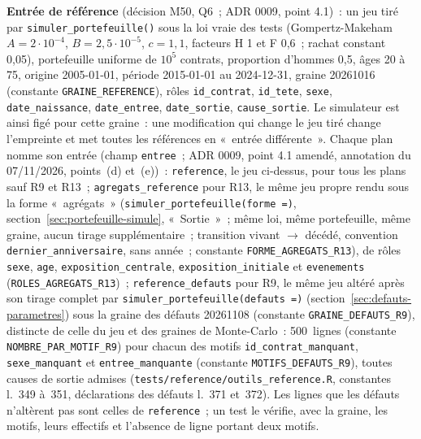 \documentclass[a4paper,11pt]{article}
\newcommand{\code}[1]{\texttt{\small #1}}
\begin{document}
\noindent
\textbf{Entrée de référence} (décision M50, Q6~; ADR 0009, point 4.1)~: un
jeu tiré par \code{simuler\_portefeuille()} sous la loi vraie des tests
(Gompertz-Makeham $A = 2 \cdot 10^{-4}$, $B = 2{,}5 \cdot 10^{-5}$,
$c = 1{,}1$, facteurs H 1 et F 0,6~; rachat constant 0,05), portefeuille
uniforme de $10^{5}$ contrats, proportion d'hommes 0,5, âges 20 à 75,
origine 2005-01-01, période 2015-01-01 au 2024-12-31, graine 20261016
(constante \code{GRAINE\_REFERENCE}), rôles \code{id\_contrat},
\code{id\_tete}, \code{sexe}, \code{date\_naissance}, \code{date\_entree},
\code{date\_sortie}, \code{cause\_sortie}. Le simulateur est ainsi figé pour
cette graine~: une modification qui change le jeu tiré change l'empreinte et
met toutes les références en «~entrée différente~». Chaque plan nomme son
entrée (champ \code{entree}~; ADR 0009, point 4.1 amendé, annotation du
07/11/2026, points~(d) et~(e))~: \code{reference}, le jeu ci-dessus, pour
tous les plans sauf R9 et R13~; \code{agregats\_reference} pour R13, le
même jeu propre rendu sous la forme «~agrégats~»
(\code{simuler\_portefeuille(forme =)}, section~\ref{sec:portefeuille-simule},
«~Sortie~»~; même loi, même portefeuille, même graine, aucun tirage
supplémentaire~; transition vivant $\to$ décédé, convention
\code{dernier\_anniversaire}, sans année~; constante
\code{FORME\_AGREGATS\_R13}), de rôles \code{sexe}, \code{age},
\code{exposition\_centrale}, \code{exposition\_initiale} et
\code{evenements} (\code{ROLES\_AGREGATS\_R13})~; \code{reference\_defauts} pour R9, le même jeu
altéré après son tirage complet par \code{simuler\_portefeuille(defauts =)}
(section~\ref{sec:defauts-parametres}) sous la graine des défauts 20261108
(constante \code{GRAINE\_DEFAUTS\_R9}), distincte de celle du jeu et des
graines de Monte-Carlo~: 500~lignes (constante \code{NOMBRE\_PAR\_MOTIF\_R9})
pour chacun des motifs \code{id\_contrat\_manquant}, \code{sexe\_manquant}
et \code{entree\_manquante} (constante \code{MOTIFS\_DEFAUTS\_R9}), toutes
causes de sortie admises (\code{tests/reference/outils\_reference.R},
constantes l.~349 à~351, déclarations des défauts l.~371 et~372). Les lignes
que les défauts n'altèrent pas sont celles de \code{reference}~; un test le
vérifie, avec la graine, les motifs, leurs effectifs et l'absence de ligne
portant deux motifs.
\end{document}
